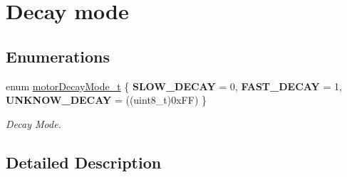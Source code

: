 \hypertarget{group___decay__mode}{}\section{Decay mode}
\label{group___decay__mode}
\subsection*{Enumerations}
\begin{DoxyCompactItemize}
\item 
\mbox{\label{group___decay__mode_ga43befb62c97ff88c1405f468c49f8334}} 
enum \mbox{\hyperlink{group___decay__mode_ga43befb62c97ff88c1405f468c49f8334}{motor\+Decay\+Mode\+\_\+t}} \{ {\bfseries S\+L\+O\+W\+\_\+\+D\+E\+C\+AY} = 0, 
{\bfseries F\+A\+S\+T\+\_\+\+D\+E\+C\+AY} = 1, 
{\bfseries U\+N\+K\+N\+O\+W\+\_\+\+D\+E\+C\+AY} = ((uint8\+\_\+t)0x\+FF)
 \}
\begin{DoxyCompactList}\small\item\em Decay Mode. \end{DoxyCompactList}\end{DoxyCompactItemize}


\subsection{Detailed Description}
